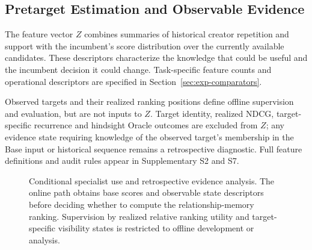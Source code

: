 \subsection{Pretarget Estimation and Observable Evidence}
\label{sec:framework-estimation}

The feature vector $Z$ combines summaries of historical creator repetition and support with the incumbent's score distribution over the currently available candidates. These descriptors characterize the knowledge that could be useful and the incumbent decision it could change. Task-specific feature counts and operational descriptors are specified in Section~\ref{sec:exp-comparators}.

Observed targets and their realized ranking positions define offline supervision and evaluation, but are not inputs to $Z$. Target identity, realized NDCG, target-specific recurrence and hindsight Oracle outcomes are excluded from $Z$; any evidence state requiring knowledge of the observed target's membership in the Base input or historical sequence remains a retrospective diagnostic. Full feature definitions and audit rules appear in Supplementary S2 and S7.

\begin{figure}[t]
\centering
{}
\caption{Conditional specialist use and retrospective evidence analysis. The online path obtains base scores and observable state descriptors before deciding whether to compute the relationship-memory ranking. Supervision by realized relative ranking utility and target-specific visibility states is restricted to offline development or analysis.}
\label{fig:framework}
\end{figure}
\FloatBarrier

